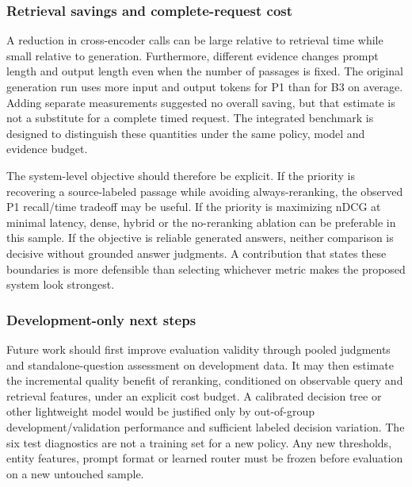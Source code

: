 \hypertarget{retrieval-savings-and-complete-request-cost}{%
\subsubsection{Retrieval savings and complete-request
cost}\label{retrieval-savings-and-complete-request-cost}}

A reduction in cross-encoder calls can be large relative to retrieval
time while small relative to generation. Furthermore, different evidence
changes prompt length and output length even when the number of passages
is fixed. The original generation run uses more input and output tokens
for P1 than for B3 on average. Adding separate measurements suggested no
overall saving, but that estimate is not a substitute for a complete
timed request. The integrated benchmark is designed to distinguish these
quantities under the same policy, model and evidence budget.

The system-level objective should therefore be explicit. If the priority
is recovering a source-labeled passage while avoiding always-reranking,
the observed P1 recall/time tradeoff may be useful. If the priority is
maximizing nDCG at minimal latency, dense, hybrid or the no-reranking
ablation can be preferable in this sample. If the objective is reliable
generated answers, neither comparison is decisive without grounded
answer judgments. A contribution that states these boundaries is more
defensible than selecting whichever metric makes the proposed system
look strongest.

\hypertarget{development-only-next-steps}{%
\subsubsection{Development-only next
steps}\label{development-only-next-steps}}

Future work should first improve evaluation validity through pooled
judgments and standalone-question assessment on development data. It may
then estimate the incremental quality benefit of reranking, conditioned
on observable query and retrieval features, under an explicit cost
budget. A calibrated decision tree or other lightweight model would be
justified only by out-of-group development/validation performance and
sufficient labeled decision variation. The six test diagnostics are not
a training set for a new policy. Any new thresholds, entity features,
prompt format or learned router must be frozen before evaluation on a
new untouched sample.

